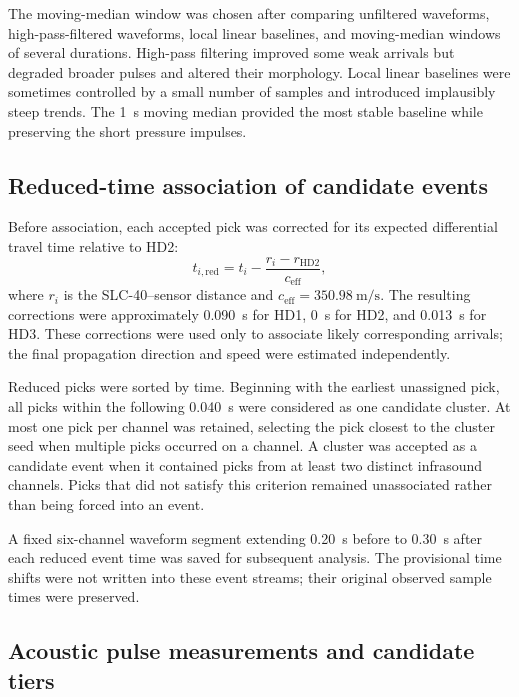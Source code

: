 \documentclass[12pt]{article}
\begin{document}
The moving-median window was chosen after comparing unfiltered waveforms,
high-pass-filtered waveforms, local linear baselines, and moving-median windows
of several durations. High-pass filtering improved some weak arrivals but
degraded broader pulses and altered their morphology. Local linear baselines
were sometimes controlled by a small number of samples and introduced
implausibly steep trends. The \SI{1}{\second} moving median provided the most
stable baseline while preserving the short pressure impulses.

\subsection{Reduced-time association of candidate events}

Before association, each accepted pick was corrected for its expected
differential travel time relative to HD2:
\begin{equation}
  t_{i,\mathrm{red}}
  = t_i - \frac{r_i-r_{\mathrm{HD2}}}{c_{\mathrm{eff}}},
  \label{eq:reduced-pick-time}
\end{equation}
where $r_i$ is the SLC-40--sensor distance and
$c_{\mathrm{eff}}=\SI{350.98}{\metre\per\second}$. The resulting corrections
were approximately \SI{0.090}{\second} for HD1, \SI{0}{\second} for HD2, and
\SI{0.013}{\second} for HD3. These corrections were used only to associate
likely corresponding arrivals; the final propagation direction and speed were
estimated independently.

Reduced picks were sorted by time. Beginning with the earliest unassigned pick,
all picks within the following \SI{0.040}{\second} were considered as one
candidate cluster. At most one pick per channel was retained, selecting the pick
closest to the cluster seed when multiple picks occurred on a channel. A cluster
was accepted as a candidate event when it contained picks from at least two
distinct infrasound channels. Picks that did not satisfy this criterion remained
unassociated rather than being forced into an event.

A fixed six-channel waveform segment extending \SI{0.20}{\second} before to
\SI{0.30}{\second} after each reduced event time was saved for subsequent
analysis. The provisional time shifts were not written into these event streams;
their original observed sample times were preserved.

\subsection{Acoustic pulse measurements and candidate tiers}
\end{document}
